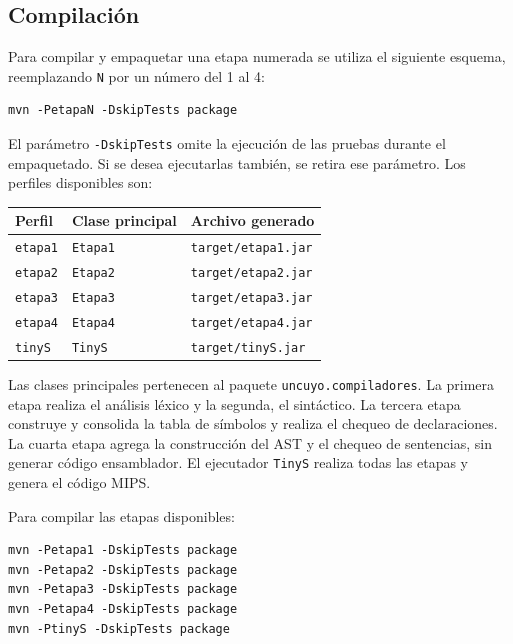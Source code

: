 \subsection{Compilación}
Para compilar y empaquetar una etapa numerada se utiliza el siguiente esquema,
reemplazando \texttt{N} por un número del 1 al 4:
\begin{verbatim}
mvn -PetapaN -DskipTests package
\end{verbatim}
El parámetro \texttt{-DskipTests} omite la ejecución de las pruebas durante
el empaquetado. Si se desea ejecutarlas también, se retira ese parámetro.
Los perfiles disponibles son:
\begin{center}
\begin{tabular}{lll}
\textbf{Perfil} & \textbf{Clase principal} & \textbf{Archivo generado} \\
\hline
\texttt{etapa1} & \texttt{Etapa1} & \texttt{target/etapa1.jar} \\
\texttt{etapa2} & \texttt{Etapa2} & \texttt{target/etapa2.jar} \\
\texttt{etapa3} & \texttt{Etapa3} & \texttt{target/etapa3.jar} \\
\texttt{etapa4} & \texttt{Etapa4} & \texttt{target/etapa4.jar} \\
\texttt{tinyS} & \texttt{TinyS} & \texttt{target/tinyS.jar} \\
\end{tabular}
\end{center}
Las clases principales pertenecen al paquete \texttt{uncuyo.compiladores}.
La primera etapa realiza el análisis léxico y la segunda, el sintáctico.
La tercera etapa construye y consolida la tabla de símbolos y realiza el
chequeo de declaraciones. La cuarta etapa agrega la construcción del AST y
el chequeo de sentencias, sin generar código ensamblador. El ejecutador
\texttt{TinyS} realiza todas las etapas y genera el código MIPS.

Para compilar las etapas disponibles:
\begin{verbatim}
mvn -Petapa1 -DskipTests package
mvn -Petapa2 -DskipTests package
mvn -Petapa3 -DskipTests package
mvn -Petapa4 -DskipTests package
mvn -PtinyS -DskipTests package
\end{verbatim}

